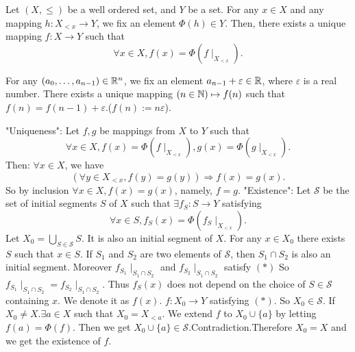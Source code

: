 \documentclass{book}
\numberwithin{equation}{section}
\begin{document}
\begin{theoremenv}
    Let $(X, \le)$ be a well ordered set,  and $Y$ be a set. For any $x\in X$ and any mapping $h:X_{<x}\rightarrow Y$,  we fix an element $\Phi(h)\in Y$. Then,  there exists a unique mapping $f:X\rightarrow Y$  such that 
    $$\forall x\in X,  f(x)=\Phi(f\mid_{X_{<x}}).$$
\end{theoremenv}
\begin{exampleenv}
    For any $(a_0, \dots, a_{n-1})\in \mathbb{R}^n$,  we fix an element $a_{n-1}+\varepsilon\in \mathbb{R}$,  where $\varepsilon$ is a real number. There exists a unique mapping $(n\in \mathbb{N})\mapsto f(n)$ such that $f(n)=f(n-1)+\varepsilon$.($f(n):=n\varepsilon$).
\end{exampleenv}
\begin{proofenv}
    \quad
    \newline
    "Uniqueness": 
    \newline
    Let $f, g$ be mappings from $X$ to $Y$ such that 
    $$\forall x\in X, f(x)=\Phi(f\mid_{X_{<x}}), g(x)=\Phi(g\mid_{X_{<x}}).$$
    Then: $\forall x\in X$,  we have 
    $$(\forall y\in X_{<x}, f(y)=g(y))\Rightarrow f(x)=g(x).$$
    So by inclusion $\forall x \in X,  f(x)=g(x)$,  namely,  $f=g$.
    \newline
    "Existence": 
    \newline
    Let $\mathscr{S}$  be the set of initial segments $S$ of $X$ such that $\exists f_S:S\rightarrow Y$ satisfying 
    \begin{equation*}
        \forall x\in S, f_S(x)=\Phi(f_S\mid_{X_{<x}}). \tag{$*$}
    \end{equation*}
    Let $X_0=\bigcup_{S\in\mathscr{S} }S$. It is also an initial segment of $X$. For any $x\in X_0$ there exists $ S $ such that $x\in S$. If $S_1$ and $S_2$ are two elements of $\mathscr{S}$,  then $S_1\cap S_2$ is also an initial segment. Moreover $f_{S_1}\mid_{S_1\cap S_2}$ and $f_{S_2}\mid_{S_1\cap S_2}$ satisfy $(*)$ So $f_{S_1}\mid_{S_1\cap S_2}=f_{S_2}\mid_{S_1\cap S_2}$. Thus $f_S(x)$ does not depend on the choice of $S\in \mathscr{S}$ containing $x$. We denote it as $f(x)$. $f:X_0\rightarrow Y$ satisfying $(*)$. So $X_0\in \mathscr{S}$.
    If $X_0\not=X.\exists a\in X$ such that $ X_0=X_{<a}$. We extend $f$ to $X_0\cup\{a\}$ by letting $f(a)=\Phi(f)$. Then we get $X_0\cup\{a\}\in \mathscr{S}$.Contradiction.Therefore $X_0=X$  and we get the existence of $f$. 
\end{proofenv}
\end{document}
